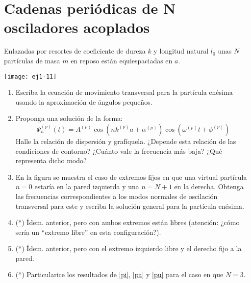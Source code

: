 \section*{Cadenas periódicas de N osciladores acoplados}


\item \label{anterior}
\begin{minipage}[t][1cm]{0.45\textwidth}
Enlazadas por resortes de coeficiente de dureza $k$ y longitud natural $l_0$ unas $N$ partículas de masa $m$ en reposo están equiespaciadas en $a$.
\end{minipage}
\begin{minipage}[c][1.5cm][t]{0.5\textwidth}
  \texttt{[image: ej1-11]}
\end{minipage}
\begin{enumerate}
	\item Escriba la ecuación de movimiento transversal para la partícula enésima usando la aproximación de ángulos pequeños.
	\item Proponga una solución de la forma:
	\[
		\Psi_{n}^{(p)}(t)=A^{(p)}\cos\left(nk^{(p)}a+\alpha^{(p)}\right)\cos\left(\omega^{(p)}t+\phi^{(p)}\right)
	\]
	Halle la relación de dispersión y grafíquela.
	¿Depende esta relación de las condiciones de contorno?
	¿Cuánto vale la frecuencia más baja?
	¿Qué representa dicho modo? 
	\item \label{pi} En la figura se muestra el caso de extremos fijos en que una virtual partícula $n=0$ estaría en la pared izquierda y una $n= N+1$ en la derecha.
	Obtenga las frecuencias correspondientes a los modos normales de oscilación transversal para este y escriba la solución general para la partícula enésima. 
	\item \label{pa} (*) Ídem. anterior, pero con ambos extremos están libres (atención: ¿cómo sería un ``extremo libre'' en esta configuración?).
	\item \label{pu} (*) Ídem. anterior, pero con el extremo izquierdo libre y el derecho fijo a la pared. 
	\item (*) Particularice los resultados de \ref{pi}, \ref{pa} y \ref{pu} para el caso en que \(N = 3\).
\end{enumerate}



